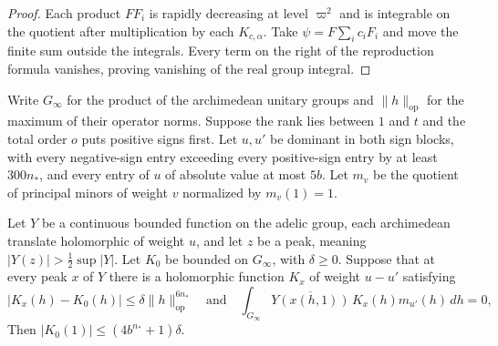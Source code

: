 \begin{proof}
Each product $FF_i$ is rapidly decreasing at level $\varpi^2$ and is integrable on the quotient after multiplication by each $K_{c,\alpha}$. Take $\psi=F\sum_i c_iF_i$ and move the finite sum outside the integrals. Every term on the right of the reproduction formula vanishes, proving vanishing of the real group integral.
\end{proof}

\begin{lemma}
\label{lem:c-kernel-peak-mean}
\emitthmsource
Write $G_\infty$ for the product of the archimedean unitary groups and $\|h\|_{\mathrm{op}}$ for the maximum of their operator norms. Suppose the rank lies between $1$ and $t$ and the total order $o$ puts positive signs first. Let $u,u'$ be dominant in both sign blocks, with every negative-sign entry exceeding every positive-sign entry by at least $300n_*$, and every entry of $u$ of absolute value at most $5b$. Let $m_v$ be the quotient of principal minors of weight $v$ normalized by $m_v(1)=1$.

Let $Y$ be a continuous bounded function on the adelic group, each archimedean translate holomorphic of weight $u$, and let $z$ be a peak, meaning $|Y(z)|>\frac12\sup|Y|$. Let $K_0$ be bounded on $G_\infty$, with $\delta\ge0$. Suppose that at every peak $x$ of $Y$ there is a holomorphic function $K_x$ of weight $u-u'$ satisfying
\[
 |K_x(h)-K_0(h)|\le\delta\|h\|_{\mathrm{op}}^{6n_*}
 \quad\text{and}\quad
 \int_{G_\infty}\overline{Y(x(h,1))}\,K_x(h)m_{u'}(h)\,dh=0 ,
\]
Then $|K_0(1)|\le(4b^{n_*}+1)\delta$.
\end{lemma}

